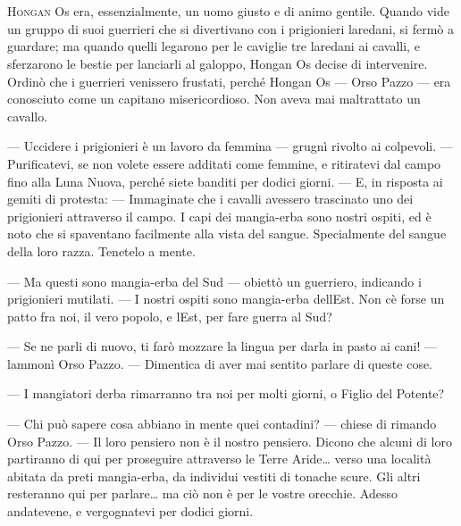 	\chapter{\phantom{title}}

\lettrine{H}{ongan} Os era, essenzialmente, un uomo giusto e di animo gentile. Quando
vide un gruppo di suoi guerrieri che si divertivano con i prigionieri
laredani, si fermò a guardare; ma quando quelli legarono per le caviglie
tre laredani ai cavalli, e sferzarono le bestie per lanciarli al
galoppo, Hongan Os decise di intervenire. Ordinò che i guerrieri
venissero frustati, perché Hongan Os --- Orso Pazzo --- era conosciuto
come un capitano misericordioso. Non aveva mai maltrattato un cavallo.

--- Uccidere i prigionieri è un lavoro da femmina --- grugnì rivolto ai
colpevoli. --- Purificatevi, se non volete essere additati come femmine,
e ritiratevi dal campo fino alla Luna Nuova, perché siete banditi per
dodici giorni. --- E, in risposta ai gemiti di protesta: --- Immaginate
che i cavalli avessero trascinato uno dei prigionieri attraverso il
campo. I capi dei mangia-erba sono nostri ospiti, ed è noto che si
spaventano facilmente alla vista del sangue. Specialmente del sangue
della loro razza. Tenetelo a mente.

--- Ma questi sono mangia-erba del Sud --- obiettò un guerriero,
indicando i prigionieri mutilati. --- I nostri ospiti sono mangia-erba
dell\textquotesingle Est. Non c\textquotesingle è forse un patto fra
noi, il vero popolo, e l\textquotesingle Est, per fare guerra al Sud?

--- Se ne parli di nuovo, ti farò mozzare la lingua per darla in pasto
ai cani! --- l\textquotesingle ammonì Orso Pazzo. --- Dimentica di aver
mai sentito parlare di queste cose.

--- I mangiatori d\textquotesingle erba rimarranno tra noi per molti
giorni, o Figlio del Potente?

--- Chi può sapere cosa abbiano in mente quei contadini? --- chiese di
rimando Orso Pazzo. --- Il loro pensiero non è il nostro pensiero.
Dicono che alcuni di loro partiranno di qui per proseguire attraverso le
Terre Aride\ldots{} verso una località abitata da preti mangia-erba, da
individui vestiti di tonache scure. Gli altri resteranno qui per
parlare\ldots{} ma ciò non è per le vostre orecchie. Adesso andatevene,
e vergognatevi per dodici giorni.

